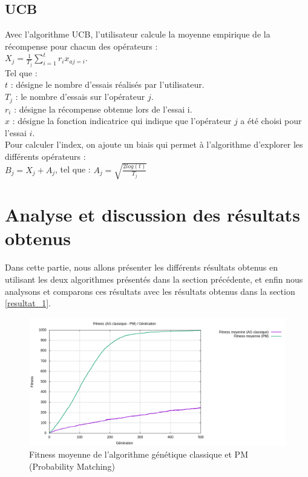 \documentclass[12pt]{article}
\begin{document}
	\subsection{UCB}
	Avec l'algorithme UCB, l'utilisateur calcule la moyenne empirique de la récompense pour chacun des opérateurs :\\
	
	 $X_j = \frac{1}{T_j} \sum_{i=1}^tr_i x_{aj=i} $.\\ 
	 
	 Tel que :\\	 
	 $t$ : désigne le nombre d'essais réalisés par l'utilisateur.\\ 
	 $T_j$ : le nombre d'essais sur l'opérateur $j$.\\ 
	 $r_i$ : désigne la récompense obtenue lors de l'essai i.\\
	 $x$ : désigne la fonction indicatrice qui indique que l'opérateur $j$ a été choisi pour l'essai $i$.\\
	 
	 Pour calculer l'index, on ajoute un biais qui permet à l'algorithme d'explorer les différents opérateurs :\\
	 $ B_j = X_j + A_j $, tel que :  $ A_j = \sqrt{\frac{2log(t)}{T_j}} $

\section{Analyse et discussion des résultats obtenus}
Dans cette partie, nous allons présenter les différents résultats obtenus en utilisant les deux algorithmes présentés dans la section précédente, et enfin nous analysons et comparons ces résultats avec les résultats obtenus dans la section \ref{resultat_1}.

\begin{figure}[H]
	\begin{center}
		\includegraphics[scale=0.5]{img/curve_ag_pm.png}
		\caption{Fitness moyenne de l'algorithme génétique classique et PM (Probability Matching)}
		\label{curve_ag_pm}
	\end{center}
\end{figure}
\end{document}
